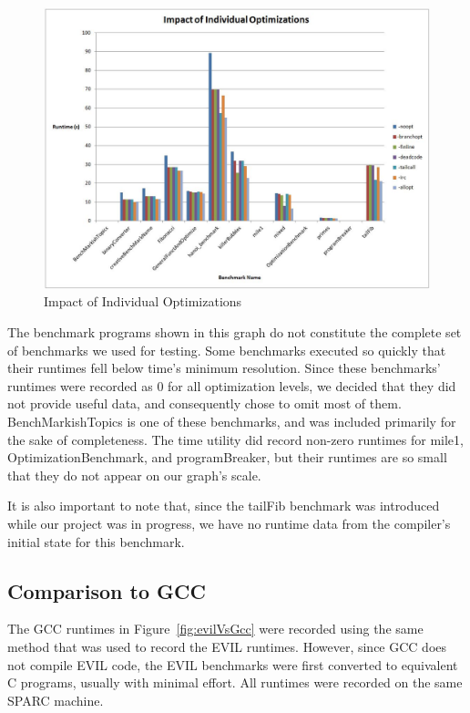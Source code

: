 \documentclass[12pt]{article}
\begin{document}
\begin{figure}[H]
   \centering
      \includegraphics[width=\textwidth]{indiv_opt.png}
   \caption{Impact of Individual Optimizations}
   \label{fig:indivOpt}
\end{figure}

The benchmark programs shown in this graph do not constitute the complete set of benchmarks we used for testing.
Some benchmarks executed so quickly that their runtimes fell below time's minimum resolution.
Since these benchmarks’ runtimes were recorded as 0 for all optimization levels, we decided that they did not provide useful data, and consequently chose to omit most of them.
BenchMarkishTopics is one of these benchmarks, and was included primarily for the sake of completeness.
The time utility did record non-zero runtimes for mile1, OptimizationBenchmark, and programBreaker, but their runtimes are so small that they do not appear on our graph's scale.

It is also important to note that, since the tailFib benchmark was introduced while our project was in progress, we have no runtime data from the compiler's initial state for this benchmark.

\subsection{Comparison to GCC}
The GCC runtimes in Figure~\ref{fig:evilVsGcc} were recorded using the same method that was used to record the EVIL runtimes.
However, since GCC does not compile EVIL code, the EVIL benchmarks were first converted to equivalent C programs, usually with minimal effort.
All runtimes were recorded on the same SPARC machine.
\end{document}

